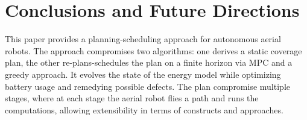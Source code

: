 \documentclass[letterpaper,10pt,conference,twoside]{IEEEtran}
\newcommand{\stt}[1]{{\small\tt #1}} %
\newcommand{\powprof}{\stt{powprofiler}}
\theoremstyle{definition}
\begin{document}



\section{Conclusions and Future Directions}  %
\label{sec:conclusion}                       %
This %
paper provides a planning-scheduling approach for autonomous aerial robots. %
The approach compromises two algorithms: one derives a static coverage plan, %
the other re-plans-schedules the plan on a finite horizon via MPC {\color{black} and a greedy approach}. It evolves the state of the energy model while optimizing battery usage and remedying possible defects. The plan compromise multiple stages, where at each stage the aerial robot flies a path and runs the computations, allowing %
extensibility in terms of constructs and approaches.
\end{document}
